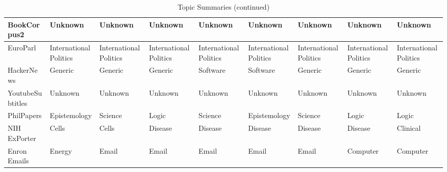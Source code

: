 \documentclass[11pt,a4paper]{article}
\begin{document}
\begin{appendices}
\begin{table*}[htb]
\begin{tiny}
\begin{tabular}{|p{}|p{}p{}p{}p{}p{}p{}p{}p{}|}
    BookCorpus2 & Unknown & Unknown & Unknown & Unknown & Unknown & Unknown & Unknown & Unknown\\\hline
    EuroParl & International Politics & International Politics & International Politics & International Politics & International Politics & International Politics & International Politics & International Politics\\\hline
    HackerNews & Generic & Generic & Generic & Software & Software & Generic & Generic & Generic\\\hline
    YoutubeSubtitles & Unknown & Unknown & Unknown & Unknown & Unknown & Unknown & Unknown & Unknown\\\hline
    PhilPapers & Epistemology & Science & Logic & Science & Epistemology & Science & Logic & Logic\\\hline
    NIH ExPorter & Cells & Cells & Disease & Disease & Disease & Disease & Disease & Clinical\\\hline
    Enron Emails & Energy & Email & Email & Email & Email & Email & Computer & Computer\\\hline
    \end{tabular}
\caption{Topic Summaries (continued)}
\end{tiny}
\end{table*}


\end{appendices}
\end{document}
